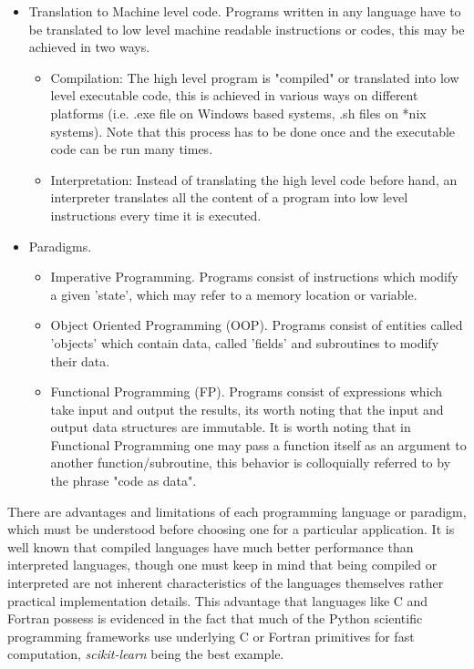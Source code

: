 \begin{itemize}
\item Translation to Machine level code.
Programs written in any language have to be translated to low level machine readable instructions or codes, this may be achieved in two ways.
\begin{itemize}
\item Compilation: The high level program is "compiled" or translated into low level executable code, this is achieved in various ways on different platforms (i.e. .exe file on Windows based systems, .sh files on *nix systems). Note that this process has to be done once and the executable code can be run many times.

\item Interpretation: Instead of translating the high level code before hand, an interpreter translates all the content of a program into low level instructions every time it is executed.

\end{itemize}

\item Paradigms.

\begin{itemize}
\item Imperative Programming.
Programs consist of instructions which modify a given 'state', which may refer to a memory location or variable.
\item Object Oriented Programming (OOP).
Programs consist of entities called 'objects' which contain data, called 'fields' and subroutines to modify their data.
\item Functional Programming (FP).
Programs consist of expressions which take input and output the results, its worth noting that the input and output data structures are immutable. It is worth noting that in Functional Programming one may pass a function itself as an argument to another function/subroutine, this behavior is colloquially referred to by the phrase "code as data". 
\end{itemize}
\end{itemize}

There are advantages and limitations of each programming language or paradigm, which must be understood before choosing one for a particular application. It is well known that compiled languages have much better performance than interpreted languages, though one must keep in mind that being compiled or interpreted are not inherent characteristics of the languages themselves rather practical implementation details. This advantage that languages like C and Fortran possess is evidenced in the fact that much of the Python scientific programming frameworks use underlying C or Fortran primitives for fast computation, \textit{scikit-learn} \cite{scikit-learn} being the best example.

